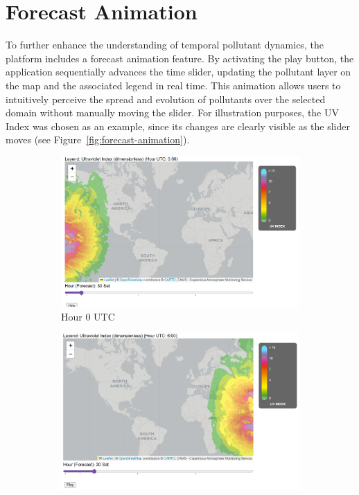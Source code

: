 \section{Forecast Animation}
To further enhance the understanding of temporal pollutant dynamics, the platform includes a forecast animation feature. By activating the play button, the application sequentially advances the time slider, updating the pollutant layer on the map and the associated legend in real time. This animation allows users to intuitively perceive the spread and evolution of pollutants over the selected domain without manually moving the slider.
For illustration purposes, the UV Index was chosen as an example, since its changes are clearly visible as the slider moves (see Figure~\ref{fig:forecast-animation}).


\begin{figure}[h!]
	\centering
	\begin{subfigure}[b]{0.23\textwidth}
		\includegraphics[width=\textwidth]{fig/animation0.png}
		\caption{Hour 0 UTC}
	\end{subfigure}
	\hfill
	\begin{subfigure}[b]{0.23\textwidth}
		\includegraphics[width=\textwidth]{fig/animation1.png}

\end{subfigure}
\end{figure}

